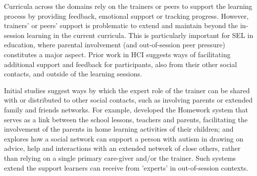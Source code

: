\documentclass[prodmode,acmtochi]{acmsmall}
\newcommand{\todo}[1]{\textrm{\textrm{\textcolor{LightBlue}{[[#1]]}}}}
\begin{document}
        Curricula across the domains rely on the trainers or peers to support the learning process by providing feedback, emotional support or tracking progress. However, trainers' or peers' support is problematic to extend and maintain beyond the in-session learning in the current curricula.  This is particularly important for SEL in education, where parental involvement (and out-of-session peer pressure) constitutes a major aspect.  %
Prior work in HCI suggests ways of facilitating additional support and feedback for participants, also from their other social contacts, and outside of the learning sessions. 


                
Initial studies suggest ways by which the expert role of the trainer can be shared with or distributed to other social contacts, such as involving parents  or extended family and friends networks. For example,  developed the Homework system that serves as a link between the school lessons, teachers and parents, facilitating the involvement of the parents in home learning activities of their children; and  explores how a social network can support a person with autism in drawing on advice, help and interactions with an extended network of close others, rather than relying on a single primary care-giver and/or the trainer. Such systems extend the support learners can receive from 'experts' in out-of-session contexts. 
\end{document}
